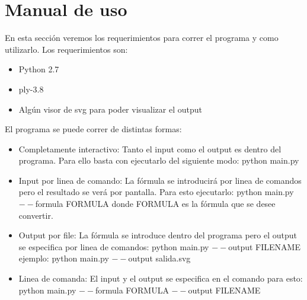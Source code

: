 \section{Manual de uso}
En esta sección veremos los requerimientos para correr el programa y como utilizarlo. Los requerimientos son:

\begin{itemize}
  \item Python 2.7
  \item ply-3.8
  \item Algún visor de svg para poder visualizar el output
\end{itemize}

El programa se puede correr de distintas formas:

\begin{itemize}
  \item Completamente interactivo: Tanto el input como el output es dentro del programa. Para ello basta con ejecutarlo del siguiente modo: python main.py
  \item Input por linea de comando: La fórmula se introducirá por linea de comandos pero el resultado se verá por pantalla. Para esto ejecutarlo: python main.py $--$formula FORMULA donde FORMULA es la fórmula que se desee convertir.
  \item Output por file: La fórmula se introduce dentro del programa pero el output se especifica por linea de comandos: python main.py $--$output FILENAME ejemplo: python main.py $--$output salida.svg
  \item Linea de comanda: El input y el output se especifica en el comando para esto: python main.py $--$formula FORMULA $--$output FILENAME
\end{itemize}
